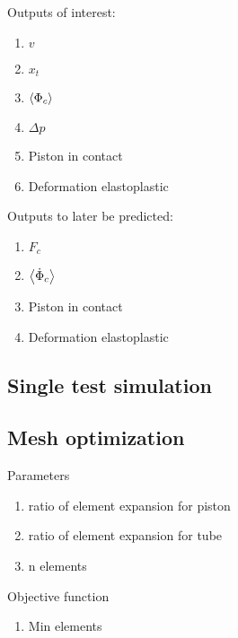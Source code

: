 \documentclass{article}
\begin{document}
Outputs of interest:
\begin{enumerate}
	\item $v$
	\item $x_{t}$
	\item $\left<\Phi_{c}\right>$
	\item $\Delta p$
	\item Piston in contact
	\item Deformation elastoplastic
\end{enumerate}

Outputs to later be predicted:
\begin{enumerate}
	\item $F_c$
	\item $\left<\dot{\Phi}_{c}\right>$
	\item Piston in contact
	\item Deformation elastoplastic
\end{enumerate}


\subsection{Single test simulation}

\subsection{Mesh optimization}

Parameters
\begin{enumerate}
	\item ratio of element expansion for piston
	\item ratio of element expansion for tube
	\item n elements
\end{enumerate}

Objective function
\begin{enumerate}
	\item Min elements
\end{enumerate}
\end{document}
